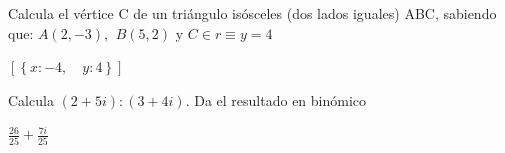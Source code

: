 \documentclass[addpoints,spanish, 12pt,a4paper]{exam}
\begin{document}
\begin{questions}


\question[2] Calcula el vértice C de un triángulo isósceles (dos lados iguales) ABC, sabiendo que: 
$A(2, -3)$, $\ B(5, 2)$ y $C \in r\equiv y=4 $  \begin{solution}  $ \left [ \left \{ x : -4, \quad y : 4\right \}\right ] $  \end{solution}





\question[2] Calcula $(2+5i):(3+4i)$. Da el resultado en binómico
\begin{solution}
    $\frac{26}{25} + \frac{7 i}{25}$
\end{solution}

\end{questions}
\end{document}
